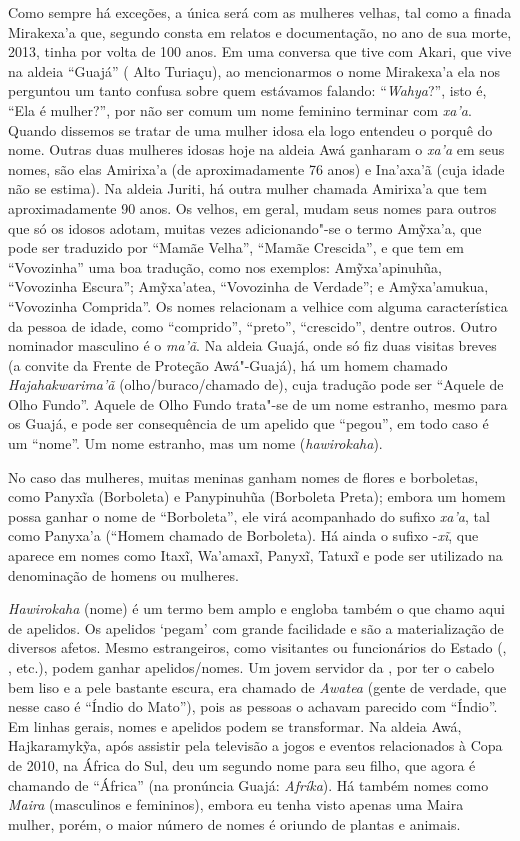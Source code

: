 Como sempre há exceções, a única será com as mulheres velhas, tal como a
finada Mirakexa'a que, segundo consta em relatos e documentação, no ano
de sua morte, 2013, tinha por volta de 100 anos. Em uma conversa que
tive com Akari, que vive na aldeia ``Guajá'' ( Alto Turiaçu), ao
mencionarmos o nome Mirakexa'a ela nos perguntou um tanto confusa sobre
quem estávamos falando: ``\emph{Wahya}?'', isto é, ``Ela é mulher?'',
por não ser comum um nome feminino terminar com \emph{xa'a}. Quando
dissemos se tratar de uma mulher idosa ela logo entendeu o porquê do
nome. Outras duas mulheres idosas hoje na aldeia Awá ganharam o
\emph{xa'a} em seus nomes, são elas Amirixa'a (de aproximadamente 76
anos) e Ina'axa'ã (cuja idade não se estima). Na aldeia Juriti, há outra
mulher chamada Amirixa'a que tem aproximadamente 90 anos. Os velhos, em
geral, mudam seus nomes para outros que só os idosos adotam, muitas
vezes adicionando"-se o termo Amỹxa'a, que pode ser traduzido por ``Mamãe
Velha'', ``Mamãe Crescida'', e que tem em ``Vovozinha'' uma boa
tradução, como nos exemplos: Amỹxa'apinuhũa, ``Vovozinha Escura'';
Amỹxa'atea, ``Vovozinha de Verdade''; e Amỹxa'amukua, ``Vovozinha
Comprida''. Os nomes relacionam a velhice com alguma característica da
pessoa de idade, como ``comprido'', ``preto'', ``crescido'', dentre
outros. Outro nominador masculino é o \emph{ma'ã}. Na aldeia Guajá, onde
só fiz duas visitas breves (a convite da Frente de Proteção Awá"-Guajá),
há um homem chamado \emph{Hajahakwarima'ã} (olho/buraco/chamado de),
cuja tradução pode ser ``Aquele de Olho Fundo''. Aquele de Olho Fundo
trata"-se de um nome estranho, mesmo para os Guajá, e pode ser
consequência de um apelido que ``pegou'', em todo caso é um ``nome''. Um
nome estranho, mas um nome (\emph{hawirokaha}).

No caso das mulheres, muitas meninas ganham nomes de flores e
borboletas, como Panyxĩa (Borboleta) e Panypinuhũa (Borboleta Preta);
embora um homem possa ganhar o nome de ``Borboleta'', ele virá
acompanhado do sufixo \emph{xa'a}, tal como Panyxa'a (``Homem chamado de
Borboleta). Há ainda o sufixo -\emph{xĩ}, que aparece em nomes como
Itaxĩ, Wa'amaxĩ, Panyxĩ, Tatuxĩ e pode ser utilizado na denominação de
homens ou mulheres.

\emph{Hawirokaha} (nome) é um termo bem amplo e engloba também o que
chamo aqui de apelidos. Os apelidos `pegam' com grande facilidade e são
a materialização de diversos afetos. Mesmo estrangeiros, como visitantes
ou funcionários do Estado (, , etc.), podem ganhar
apelidos/nomes. Um jovem servidor da , por ter o cabelo bem liso e
a pele bastante escura, era chamado de \emph{Awatea} (gente de verdade,
que nesse caso é ``Índio do Mato''), pois as pessoas o achavam parecido
com ``Índio''. Em linhas gerais, nomes e apelidos podem se transformar.
Na aldeia Awá, Hajkaramykỹa, após assistir pela televisão a jogos
e eventos relacionados à Copa de 2010, na África do Sul, deu um segundo
nome para seu filho, que agora é chamando de ``África'' (na pronúncia
Guajá: \emph{Afríka}). Há também nomes como \emph{Maira} (masculinos e
femininos), embora eu tenha visto apenas uma Maira mulher, porém, o
maior número de nomes é oriundo de plantas e animais.

